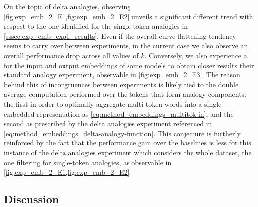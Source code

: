On the topic of delta analogies, observing \cref{fig:exp_emb_2_E1,fig:exp_emb_2_E2} unveils a significant different trend with respect to the one identified for the single-token analogies in \cref{sssec:exp_emb_exp1_results}.
Even if the overall curve flattening tendency seems to carry over between experiments, in the current case we also observe an overall performance drop across all values of $k$.
Conversely, we also experience a  for the input and output embeddings of some models to obtain closer results  their standard analogy experiment, observable in \cref{fig:exp_emb_2_E3}.
The reason behind this  of incongruences between experiments is likely tied to the double average computation performed over the tokens that form analogy components: the first in order to optimally aggregate multi-token words into a single embedded representation as \cref{eq:method_embeddings_multitok-in}, and the second as prescribed by the delta analogies experiment referenced in \cref{eq:method_embeddings_delta-analogy-function}.
This conjecture is furtherly reinforced by the fact that the performance gain over the baselines is less  for this instance of the delta analogies experiment which considers the whole dataset,  the one filtering for single-token analogies, as observable in \cref{fig:exp_emb_2_E1,fig:exp_emb_2_E2}.

\begin{figure}[t!]
    \centering
    \quad
    \caption{}
    \label{fig:exp_emb_2_E}
\end{figure}

\subsection{Discussion}\label{ssec:exp_emb_discussion}

